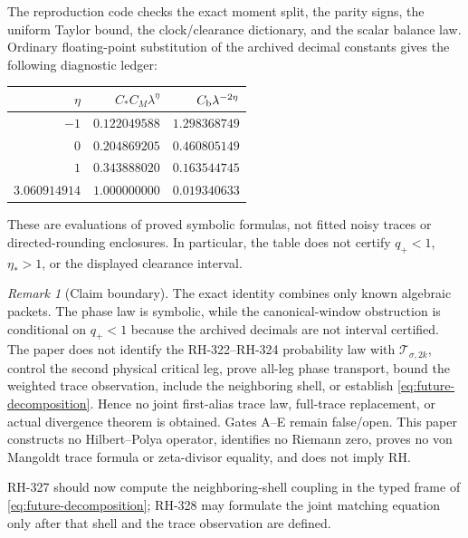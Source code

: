 \documentclass[11pt]{article}
\theoremstyle{remark}
\newtheorem{remark}[theorem]{Remark}
\newcommand{\1}{\mathbf 1}
\newcommand{\cT}{\mathcal T}
\begin{document}
The reproduction code checks the exact moment split, the parity signs, the
uniform Taylor bound, the clock/clearance dictionary, and the scalar balance
law.  Ordinary floating-point substitution of the archived decimal constants
gives the following diagnostic ledger:
\begin{center}\small
\begin{tabular}{rrr}
\toprule
$\eta$ & $C_*C_M\lambda^\eta$ & $C_{\rm b}\lambda^{-2\eta}$\\
\midrule
$-1$ & $0.122049588$ & $1.298368749$\\
$0$ & $0.204869205$ & $0.460805149$\\
$1$ & $0.343888020$ & $0.163544745$\\
$3.060914914$ & $1.000000000$ & $0.019340633$\\
\bottomrule
\end{tabular}
\end{center}
These are evaluations of proved symbolic formulas, not fitted noisy traces or
directed-rounding enclosures.  In particular, the table does not certify
$q_+<1$, $\eta_*>1$, or the displayed clearance interval.

\begin{remark}[Claim boundary]
The exact identity combines only known algebraic packets.  The phase law is
symbolic, while the canonical-window obstruction is conditional on
$q_+<1$ because the archived decimals are not interval certified.  The paper
does not
identify the RH-322--RH-324 probability law with $\cT_{\sigma,2k}$, control
the second physical critical leg, prove all-leg phase transport, bound the
weighted trace observation, include the neighboring shell, or establish
\eqref{eq:future-decomposition}.  Hence no joint first-alias trace law,
full-trace replacement, or actual divergence theorem is obtained.  Gates
A--E remain false/open.  This paper constructs no Hilbert--Polya operator,
identifies no Riemann zero, proves no von Mangoldt trace formula or
zeta-divisor equality, and does not imply RH.
\end{remark}

RH-327 should now compute the neighboring-shell coupling in the typed frame
of \eqref{eq:future-decomposition}; RH-328 may formulate the joint matching
equation only after that shell and the trace observation are defined.
\end{document}
